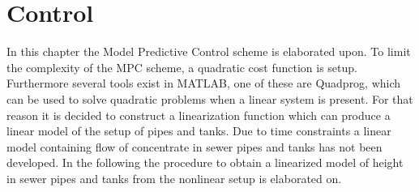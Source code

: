 \chapter{Control}\label{ch:control}

In this chapter the Model Predictive Control scheme is elaborated upon. To limit the complexity of the MPC scheme, a quadratic cost function is setup. 
Furthermore several tools exist in MATLAB, one of these are Quadprog, which can be used to solve quadratic problems when a linear system is present.  
For that reason it is decided to construct a linearization function which can produce a linear model of the setup of pipes and tanks. 
Due to time constraints a linear model containing flow of concentrate in sewer pipes and tanks has not been developed. 
In the following the procedure to obtain a linearized model of height in sewer pipes and tanks from the nonlinear setup is elaborated on.



